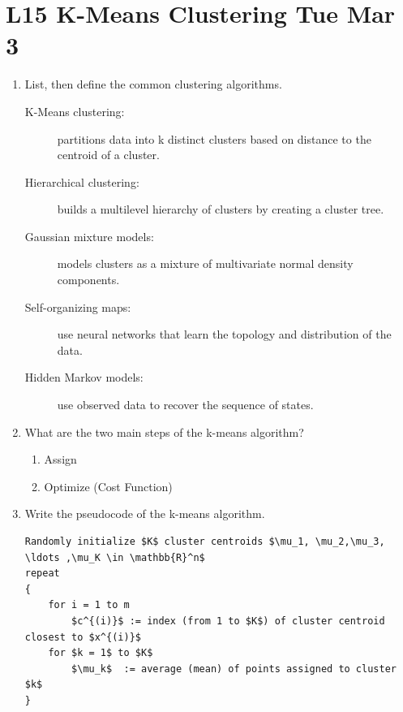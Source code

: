 \documentclass[12pt]{article}
\newenvironment{QandA}{\begin{enumerate}[label=\bfseries\arabic*.]\bfseries}
{\end{enumerate}}
\newenvironment{answered}{\par\normalfont\color{Sepia}}{}
\begin{document}
\section*{L15 K-Means Clustering \textemdash{} Tue Mar 3}
\begin{QandA}
    \item List, then define the common clustering algorithms.
    \begin{answered}
        \begin{description}
            \item[K-Means clustering:] partitions data into k distinct clusters based on distance to the centroid of a cluster.
            \item[Hierarchical clustering:] builds a multilevel hierarchy of clusters by creating a cluster tree.
            \item[Gaussian mixture models:] models clusters as a mixture of multivariate normal density components.
            \item[Self-organizing maps:] use neural networks that learn the topology and distribution of the data.
            \item[Hidden Markov models:] use observed data to recover the sequence of states.
        \end{description}
    \end{answered}


    \item What are the two main steps of the k-means algorithm?
    \begin{answered}
        \begin{enumerate}
            \item Assign
            \item Optimize (Cost Function)
        \end{enumerate}
    \end{answered}

    \item Write the pseudocode of the k-means algorithm.
    \begin{answered}
        \begin{lstlisting}
Randomly initialize $K$ cluster centroids $\mu_1, \mu_2,\mu_3, \ldots ,\mu_K \in \mathbb{R}^n$
repeat
{
    for i = 1 to m
        $c^{(i)}$ := index (from 1 to $K$) of cluster centroid closest to $x^{(i)}$
    for $k = 1$ to $K$
        $\mu_k$  := average (mean) of points assigned to cluster $k$
}
        \end{lstlisting}
    \end{answered}


\end{QandA}
\end{document}
